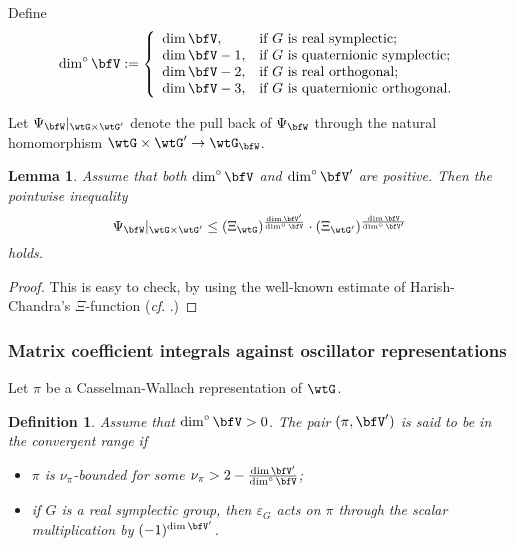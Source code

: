 \documentclass[12pt,a4paper]{amsart}
\numberwithin{equation}{section}
\newtheorem{lem}[thm]{Lemma}
\newtheorem{defn}[thm]{Definition}
\theoremstyle{remark}
\def\abfV{\bfV'}
\def\dimo{\dim^\circ}
\def\tGVr{\wtG}
\def\tGVar{\wtG'}
\begin{document}
Define
\[%
  \dimo \bfV:=\left\{
    \begin{array}{ll}
      \dim \bfV,  & \hbox{if $G$ is real symplectic;} \\
      \dim \bfV-1, & \hbox{if $G$ is quaternionic symplectic;} \\
      \dim \bfV-2, & \hbox{if $G$ is real orthogonal;} \\
      \dim \bfV-3, & \hbox{if $G$ is quaternionic orthogonal.} \\
    \end{array}
  \right.
\]%


Let $\Psi_{\bfW}|_{\tGVr\times \tGVar}$ denote the pull back of
$\Psi_{\bfW}$ through the natural homomorphism
$\tGVr\times \tGVar\rightarrow \wtG_{\bfW}$.



\begin{lem}\label{estosc2}
  Assume that both $\dimo \bfV$ and $\dimo \abfV$ are
  positive. Then the pointwise inequality
\[
  \Psi_{\bfW}|_{\tGVr\times \tGVar}\leq  (\Xi_{\tGVr})^{\frac{\dim \abfV}{\dimo \bfV}}  \cdot (\Xi_{\tGVar})^{\frac{\dim \bfV}{\dimo \abfV}}
\]
holds.
\end{lem}
\begin{proof}
This is easy to check, by using the  well-known estimate of  Harish-Chandra's $\Xi$-function (\emph{cf}.  \cite[Theorem 4.5.3]{Wa1}.)

\end{proof}


\subsubsection{Matrix coefficient integrals against oscillator representations}

 Let $\pi$ be a  Casselman-Wallach representation of $\tGVr$.


 \begin{defn}\label{defn:CR}
   Assume that $\dimo \bfV>0$. The pair $(\pi, \abfV)$ is said to be in the
   \emph{convergent range} if
   \begin{itemize}
   \item $\pi$ is $\nu_\pi$-bounded for some
     $\nu_\pi>2-\frac{\dim \abfV}{\dimo \bfV}$;
     \item
     if $G$ is a real symplectic group, then $\varepsilon_G$ acts on $\pi$ through the scalar multiplication by $(-1)^{\dim \bfV'}$.
        \end{itemize}
\end{defn}
\end{document}
